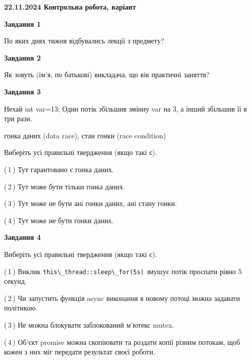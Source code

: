 \documentclass[12pt, ukrainian]{article}
\def\code#1{\Verb!#1!}
\begin{document}
\begin {large}

\textbf{22.11.2024 Контрольна робота, варіант  }\par


{

\begin{center}
\textbf{Завдання 1}
\end{center}

По яких днях тижня відбувались лекції з предмету?


\begin{center}
\textbf{Завдання 2}
\end{center}

Як зовуть (ім'я, по батькові) викладача, що вів практичні заняття?


\begin{center}
\textbf{Завдання 3}
\end{center}

Нехай int var=13; Один потік збільшив змінну var на 3, а інший збільшив її в три рази.

гонка даних (data race), стан гонки (race condition)

Виберіть усі правильні твердження (якщо такі є).\par
\vspace{2mm}
(\,1\,) Тут гарантовано є гонка даних.%

(\,2\,) Тут може бути тільки гонка даних.%

(\,3\,) Тут може не бути ані гонки даних, ані стану гонки.%

(\,4\,) Тут може не бути гонки даних.%


\begin{center}
\textbf{Завдання 4}
\end{center}

Виберіть усі правильні твердження (якщо такі є).\par
\vspace{2mm}

(\,1\,) Виклик \code{this\_thread::sleep\_for(5s)} змушує потік проспати рівно 5 секунд.%

(\,2\,) Чи запустить функція  async виконання в новому потоці можна задавати політикою.%

(\,3\,) Не можна блокувати заблокований м’ютекс mutex.%

(\,4\,) Об’єкт promise можна скопіювати та роздати копії різним потокам, щоб кожен з них міг передати результат своєї роботи.%


}
\end{large}
\end{document}
